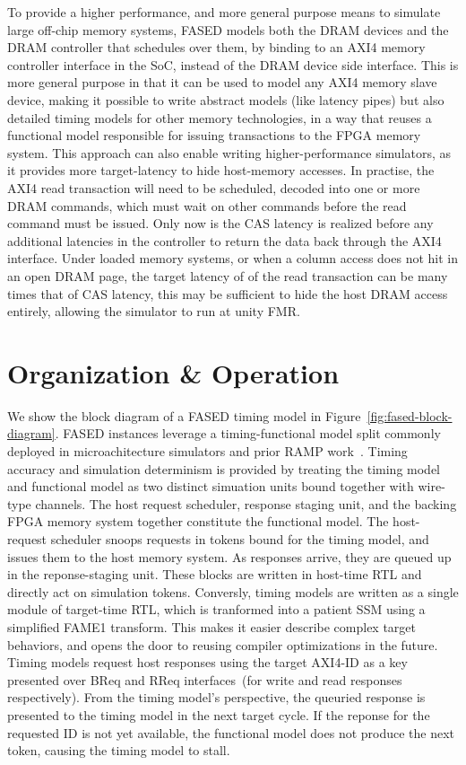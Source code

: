 To provide a higher performance, and more general purpose means to simulate
large off-chip memory systems, FASED models both the DRAM devices and the DRAM
controller that schedules over them, by binding to an AXI4 memory controller
interface in the SoC, instead of the DRAM device side interface. This is more
general purpose in that it can be used to model any AXI4 memory slave device,
making it possible to write abstract models (like latency pipes) but
also detailed timing models for other memory technologies, in a way that reuses
a functional model responsible for issuing transactions to the FPGA memory
system. This approach can also enable writing higher-performance simulators, as
it provides more target-latency to hide host-memory accesses. In practise, the
AXI4 read transaction will need to be scheduled, decoded into one or more DRAM
commands, which must wait on other commands before the read command must be
issued. Only now is the CAS latency is realized before any additional latencies
in the controller to return the data back through the AXI4 interface. Under
loaded memory systems, or when a column access does not hit in an open DRAM
page, the target latency of of the read transaction can be many times that of
CAS latency, this may be sufficient to hide the host DRAM access entirely,
allowing the simulator to run at unity FMR.

\section{Organization \& Operation}
We show the block diagram of a FASED timing model in
Figure~\ref{fig:fased-block-diagram}. FASED instances leverage a
timing-functional model split commonly deployed in microachitecture simulators
 and prior RAMP work~\cite{FAST, RAMPGold}. Timing
accuracy and simulation determinism is provided by treating the timing model
and functional model as two distinct simuation units bound together with
wire-type channels.  The host request scheduler, response staging unit, and the
backing FPGA memory system together constitute the functional model. The
host-request scheduler snoops requests in tokens bound for the timing model,
and issues them to the host memory system.  As responses arrive, they are
queued up in the reponse-staging unit.  These blocks are written in host-time
RTL and directly act on simulation tokens.  Conversly, timing models are
written as a single module of target-time RTL, which is tranformed into a
patient SSM using a simplified FAME1 transform. This makes it easier describe
complex target behaviors, and opens the door to reusing compiler optimizations
in the future. Timing models request host responses using the target AXI4-ID as a key
presented over BReq and RReq interfaces~(for write and read responses
respectively). From the timing model's perspective, the queuried response is
presented to the timing model in the next target cycle. If the reponse for the
requested ID is not yet available, the functional model does not produce the
next token, causing the timing model to stall.

